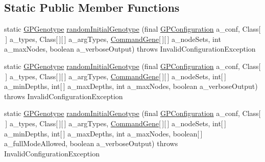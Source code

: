 \subsection*{Static Public Member Functions}
\begin{DoxyCompactItemize}
\item 
static \hyperlink{classorg_1_1jgap_1_1gp_1_1impl_1_1_g_p_genotype}{G\-P\-Genotype} \hyperlink{classorg_1_1jgap_1_1gp_1_1impl_1_1_g_p_genotype_a59354275c3ff7c6b47c4c676c13a4422}{random\-Initial\-Genotype} (final \hyperlink{classorg_1_1jgap_1_1gp_1_1impl_1_1_g_p_configuration}{G\-P\-Configuration} a\-\_\-conf, Class\mbox{[}$\,$\mbox{]} a\-\_\-types, Class\mbox{[}$\,$\mbox{]}\mbox{[}$\,$\mbox{]} a\-\_\-arg\-Types, \hyperlink{classorg_1_1jgap_1_1gp_1_1_command_gene}{Command\-Gene}\mbox{[}$\,$\mbox{]}\mbox{[}$\,$\mbox{]} a\-\_\-node\-Sets, int a\-\_\-max\-Nodes, boolean a\-\_\-verbose\-Output)  throws Invalid\-Configuration\-Exception 
\item 
static \hyperlink{classorg_1_1jgap_1_1gp_1_1impl_1_1_g_p_genotype}{G\-P\-Genotype} \hyperlink{classorg_1_1jgap_1_1gp_1_1impl_1_1_g_p_genotype_a7e59aff645b8386adcad62e9ccdfd00d}{random\-Initial\-Genotype} (final \hyperlink{classorg_1_1jgap_1_1gp_1_1impl_1_1_g_p_configuration}{G\-P\-Configuration} a\-\_\-conf, Class\mbox{[}$\,$\mbox{]} a\-\_\-types, Class\mbox{[}$\,$\mbox{]}\mbox{[}$\,$\mbox{]} a\-\_\-arg\-Types, \hyperlink{classorg_1_1jgap_1_1gp_1_1_command_gene}{Command\-Gene}\mbox{[}$\,$\mbox{]}\mbox{[}$\,$\mbox{]} a\-\_\-node\-Sets, int\mbox{[}$\,$\mbox{]} a\-\_\-min\-Depths, int\mbox{[}$\,$\mbox{]} a\-\_\-max\-Depths, int a\-\_\-max\-Nodes, boolean a\-\_\-verbose\-Output)  throws Invalid\-Configuration\-Exception 
\item 
static \hyperlink{classorg_1_1jgap_1_1gp_1_1impl_1_1_g_p_genotype}{G\-P\-Genotype} \hyperlink{classorg_1_1jgap_1_1gp_1_1impl_1_1_g_p_genotype_a47a8848949757df02df0b4503bd2bea7}{random\-Initial\-Genotype} (final \hyperlink{classorg_1_1jgap_1_1gp_1_1impl_1_1_g_p_configuration}{G\-P\-Configuration} a\-\_\-conf, Class\mbox{[}$\,$\mbox{]} a\-\_\-types, Class\mbox{[}$\,$\mbox{]}\mbox{[}$\,$\mbox{]} a\-\_\-arg\-Types, \hyperlink{classorg_1_1jgap_1_1gp_1_1_command_gene}{Command\-Gene}\mbox{[}$\,$\mbox{]}\mbox{[}$\,$\mbox{]} a\-\_\-node\-Sets, int\mbox{[}$\,$\mbox{]} a\-\_\-min\-Depths, int\mbox{[}$\,$\mbox{]} a\-\_\-max\-Depths, int a\-\_\-max\-Nodes, boolean\mbox{[}$\,$\mbox{]} a\-\_\-full\-Mode\-Allowed, boolean a\-\_\-verbose\-Output)  throws Invalid\-Configuration\-Exception 
\item 

\end{DoxyCompactItemize}
